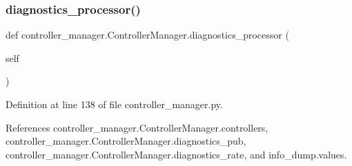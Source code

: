 \subsubsection{\texorpdfstring{diagnostics\+\_\+processor()}{diagnostics\_processor()}}
{\footnotesize\ttfamily def controller\+\_\+manager.\+Controller\+Manager.\+diagnostics\+\_\+processor (\begin{DoxyParamCaption}\item[{}]{self }\end{DoxyParamCaption})}



Definition at line 138 of file controller\+\_\+manager.\+py.



References controller\+\_\+manager.\+Controller\+Manager.\+controllers, controller\+\_\+manager.\+Controller\+Manager.\+diagnostics\+\_\+pub, controller\+\_\+manager.\+Controller\+Manager.\+diagnostics\+\_\+rate, and info\+\_\+dump.\+values.


